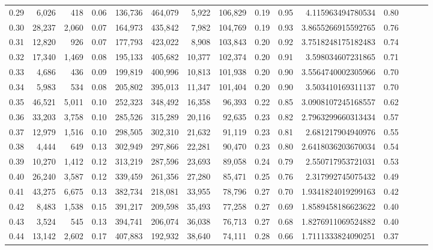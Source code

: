 \begin{tabular}{rrrrrrrrrrrrrrr}
0.29 &   6,026 &    418 &  0.06 &  136,736 &  464,079 &    5,922 &  106,829 &  0.19 &  0.95 &       4.115963494780534 &      0.80 \\
0.30 &  28,237 &  2,060 &  0.07 &  164,973 &  435,842 &    7,982 &  104,769 &  0.19 &  0.93 &      3.8655266915592765 &      0.76 \\
0.31 &  12,820 &    926 &  0.07 &  177,793 &  423,022 &    8,908 &  103,843 &  0.20 &  0.92 &      3.7518248175182483 &      0.74 \\
0.32 &  17,340 &  1,469 &  0.08 &  195,133 &  405,682 &   10,377 &  102,374 &  0.20 &  0.91 &       3.598034607231865 &      0.71 \\
0.33 &   4,686 &    436 &  0.09 &  199,819 &  400,996 &   10,813 &  101,938 &  0.20 &  0.90 &      3.5564740002305966 &      0.70 \\
0.34 &   5,983 &    534 &  0.08 &  205,802 &  395,013 &   11,347 &  101,404 &  0.20 &  0.90 &       3.503410169311137 &      0.70 \\
0.35 &  46,521 &  5,011 &  0.10 &  252,323 &  348,492 &   16,358 &   96,393 &  0.22 &  0.85 &      3.0908107245168557 &      0.62 \\
0.36 &  33,203 &  3,758 &  0.10 &  285,526 &  315,289 &   20,116 &   92,635 &  0.23 &  0.82 &      2.7963299660313434 &      0.57 \\
0.37 &  12,979 &  1,516 &  0.10 &  298,505 &  302,310 &   21,632 &   91,119 &  0.23 &  0.81 &       2.681217904940976 &      0.55 \\
0.38 &   4,444 &    649 &  0.13 &  302,949 &  297,866 &   22,281 &   90,470 &  0.23 &  0.80 &      2.6418036203670034 &      0.54 \\
0.39 &  10,270 &  1,412 &  0.12 &  313,219 &  287,596 &   23,693 &   89,058 &  0.24 &  0.79 &       2.550717953721031 &      0.53 \\
0.40 &  26,240 &  3,587 &  0.12 &  339,459 &  261,356 &   27,280 &   85,471 &  0.25 &  0.76 &       2.317992745075432 &      0.49 \\
0.41 &  43,275 &  6,675 &  0.13 &  382,734 &  218,081 &   33,955 &   78,796 &  0.27 &  0.70 &      1.9341824019299163 &      0.42 \\
0.42 &   8,483 &  1,538 &  0.15 &  391,217 &  209,598 &   35,493 &   77,258 &  0.27 &  0.69 &      1.8589458186623622 &      0.40 \\
0.43 &   3,524 &    545 &  0.13 &  394,741 &  206,074 &   36,038 &   76,713 &  0.27 &  0.68 &      1.8276911069524882 &      0.40 \\
0.44 &  13,142 &  2,602 &  0.17 &  407,883 &  192,932 &   38,640 &   74,111 &  0.28 &  0.66 &      1.7111333824090251 &      0.37 \\

\end{tabular}
